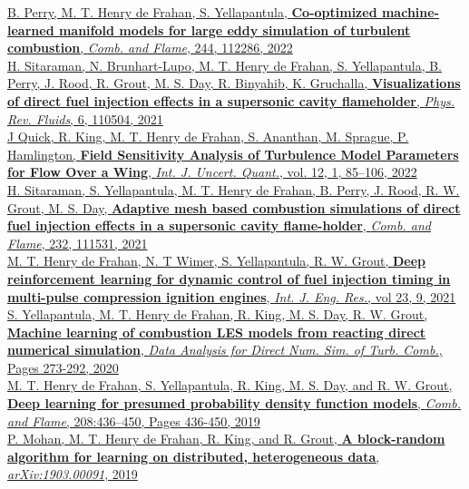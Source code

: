 \documentclass[11pt,letterpaper]{article}
\begin{document}
\href{https://doi.org/10.1016/j.combustflame.2022.112286}{B. Perry, M. T. Henry de Frahan, S. Yellapantula, \textbf{Co-optimized machine-learned manifold models for large eddy simulation of turbulent combustion}, \textit{Comb. and Flame}, 244, 112286, 2022}\\[2ex]
\href{https://doi.org/10.1103/PhysRevFluids.6.110504}{H. Sitaraman, N. Brunhart-Lupo, M. T. Henry de Frahan, S. Yellapantula, B. Perry, J. Rood, R. Grout, M. S. Day, R. Binyahib, K. Gruchalla, \textbf{Visualizations of direct fuel injection effects in a supersonic cavity flameholder}, \textit{Phys. Rev. Fluids}, 6, 110504, 2021}\\[2ex]
\href{https://doi.org/10.1615/Int.J.UncertaintyQuantification.2021036467 }{J Quick, R. King, M. T. Henry de Frahan, S. Ananthan, M. Sprague, P. Hamlington, \textbf{Field Sensitivity Analysis of Turbulence Model Parameters for Flow Over a Wing}, \textit{Int. J. Uncert. Quant.}, vol. 12, 1, 85--106, 2022}\\[2ex]
\href{https://doi.org/10.1016/j.combustflame.2021.111531}{H. Sitaraman, S. Yellapantula, M. T. Henry de Frahan, B. Perry, J. Rood, R. W. Grout, M. S. Day, \textbf{Adaptive mesh based combustion simulations of direct fuel injection effects in a supersonic cavity flame-holder}, \textit{Comb. and Flame}, 232, 111531, 2021}\\[2ex]
\href{https://doi.org/10.1177/14680874211019345}{M. T. Henry de Frahan, N. T Wimer, S. Yellapantula, R. W. Grout, \textbf{Deep reinforcement learning for dynamic control of fuel injection timing in multi-pulse compression ignition engines}, \textit{Int. J. Eng. Res.}, vol 23, 9, 2021}\\[2ex]
\href{https://link.springer.com/chapter/10.1007/978-3-030-44718-2_14}{S. Yellapantula, M. T. Henry de Frahan, R. King, M. S. Day, R. W. Grout, \textbf{Machine learning of combustion LES models from reacting direct numerical simulation}, \textit{Data Analysis for Direct Num. Sim. of Turb. Comb.}, Pages 273-292, 2020}\\[2ex]
\href{https://doi.org/10.1016/j.combustflame.2019.07.015}{M. T. Henry de Frahan, S. Yellapantula, R. King, M. S. Day, and R. W. Grout, \textbf{Deep learning for presumed probability density function models}, \textit{Comb. and Flame}, 208:436--450, Pages 436-450, 2019}\\[2ex]%
\href{http://arxiv.org/abs/1903.00091}{P. Mohan, M. T. Henry de Frahan, R. King, and R. Grout, \textbf{A block-random algorithm for learning on distributed, heterogeneous data}, \textit{arXiv:1903.00091}, 2019}\\[2ex]%
\end{document}
